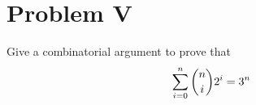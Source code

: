 \section{Problem V}
Give a combinatorial argument to prove that
$$ \sum_{i=0}^{n}\dbinom{n}{i}2^{i} = 3^n $$